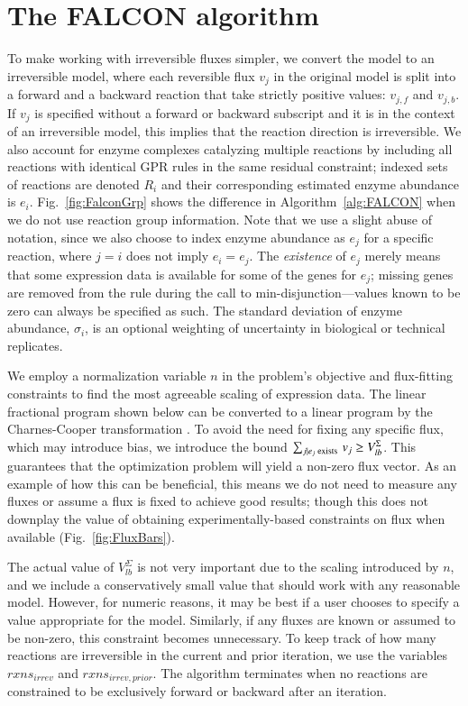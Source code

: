 \section{The FALCON algorithm}
\label{sec:FALCON}

To make working with irreversible fluxes simpler, we convert the model
to an irreversible model, where each reversible flux $v_j$ in the
original model is split into a forward and a backward reaction that take
strictly positive values: $v_{j,f}$ and $v_{j,b}$. If $v_j$ is
specified without a forward or backward subscript and it is in the
context of an irreversible model, this implies that the reaction
direction is irreversible. We also account for enzyme complexes
catalyzing multiple reactions by including all reactions with identical
GPR rules in the same residual
constraint; indexed sets of reactions are denoted $R_i$ and their
corresponding estimated enzyme abundance is $e_i$. Fig.~\ref{fig:FalconGrp} 
shows the difference in Algorithm~\ref{alg:FALCON} when we do not 
use reaction group information. Note that we use a
slight abuse of notation, since we also choose to index enzyme
abundance as $e_j$ for a specific reaction, where $j = i$ does not
imply $e_i = e_j$. The \emph{existence} of $e_j$ merely means that
some expression data is available for some of the genes for $e_j$;
missing genes are removed from the rule during the call to
min-disjunction---values known to be zero can always be specified as
such. The standard deviation of enzyme abundance, $\sigma_i$, is an
optional weighting of uncertainty in biological or technical
replicates.

We employ a normalization variable $n$ in the problem's objective and
flux-fitting constraints to find the most agreeable scaling of
expression data. The linear fractional program shown below can be
converted to a linear program by the Charnes-Cooper transformation
\citep{Boyd2004}. To avoid the need for fixing any specific flux, which
may introduce bias, we introduce the bound $\sum_{j \mid e_j 
\textnormal{ exists }} v_j \geq V_{lb}^{\Sigma}$. This guarantees that
the optimization problem will yield a non-zero flux vector. As an
example of how this can be beneficial, this means we do not need to
measure any fluxes or assume a flux is fixed to achieve good results;
though this does not downplay the value of obtaining
experimentally-based constraints on flux when available 
(\suppOrApp Fig.~\ref{fig:FluxBars}).

The actual value of $V_{lb}^{\Sigma}$ is not very important due to the
scaling introduced by $n$, and we include a conservatively small value
that should work with any reasonable model. However, for numeric
reasons, it may be best if a user chooses to specify a value
appropriate for the model. Similarly, if any fluxes are known or
assumed to be non-zero, this constraint becomes unnecessary. To keep
track of how many reactions are irreversible in the current and prior
iteration, we use the variables $rxns_{irrev}$ and
$rxns_{irrev,prior}$. The algorithm terminates when no reactions are
constrained to be exclusively forward or backward after an iteration.

